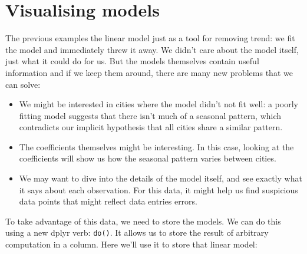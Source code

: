 \section{Visualising models}\label{sub:modelvis}

The previous examples the linear model just as a tool for removing
trend: we fit the model and immediately threw it away. We didn't care
about the model itself, just what it could do for us. But the models
themselves contain useful information and if we keep them around, there
are many new problems that we can solve:

\begin{itemize}
\item
  We might be interested in cities where the model didn't not fit well:
  a poorly fitting model suggests that there isn't much of a seasonal
  pattern, which contradicts our implicit hypothesis that all cities
  share a similar pattern.
\item
  The coefficients themselves might be interesting. In this case,
  looking at the coefficients will show us how the seasonal pattern
  varies between cities.
\item
  We may want to dive into the details of the model itself, and see
  exactly what it says about each observation. For this data, it might
  help us find suspicious data points that might reflect data entries
  errors.
\end{itemize}

To take advantage of this data, we need to store the models. We can do
this using a new dplyr verb: \texttt{do()}. It allows us to store the
result of arbitrary computation in a column. Here we'll use it to store
that linear model: 

\begin{Shaded}
\end{Shaded}

